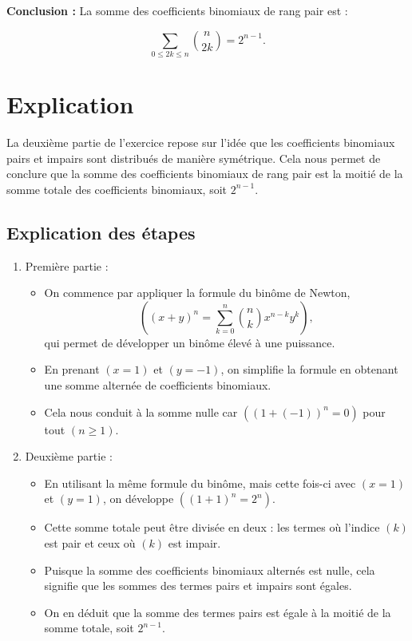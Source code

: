\documentclass[a4paper,oneside,12pt]{amsbook}
\theoremstyle{definition}
\theoremstyle{remark}
\begin{document}
\textbf{Conclusion :} La somme des coefficients binomiaux de rang pair est :

\[
\sum_{0 \leq 2k \leq n} \binom{n}{2k} = 2^{n-1}.
\]

\section*{Explication}

La deuxième partie de l'exercice repose sur l'idée que les coefficients binomiaux pairs et impairs sont distribués de manière symétrique. Cela nous permet de conclure que la somme des coefficients binomiaux de rang pair est la moitié de la somme totale des coefficients binomiaux, soit \(2^{n-1}\).

\subsection*{Explication des étapes }
    \begin{enumerate}
        \item Première partie :
	\begin{itemize}
	    \item On commence par appliquer la formule du binôme de Newton, $$((x + y)^n = \sum_{k=0}^n \binom{n}{k} x^{n-k} y^k),$$ qui permet de développer un binôme élevé à une puissance.
     \item En prenant $(x = 1)$ et $(y = -1)$, on simplifie la formule en obtenant une somme alternée de coefficients binomiaux.
     \item Cela nous conduit à la somme nulle car $((1 + (-1))^n = 0)$ pour tout $(n \geq 1).$
	\end{itemize}
     \item Deuxième partie :
     \begin{itemize}
		\item En utilisant la même formule du binôme, mais cette fois-ci avec $(x = 1)$ et $(y = 1)$, on développe $((1 + 1)^n = 2^n)$.
	      \item 	Cette somme totale peut être divisée en deux : les termes où l’indice $(k)$ est pair et ceux où $(k)$ est impair.
       \item Puisque la somme des coefficients binomiaux alternés est nulle, cela signifie que les sommes des termes pairs et impairs sont égales.
       \item On en déduit que la somme des termes pairs est égale à la moitié de la somme totale, soit $2^{n-1}$.
     \end{itemize}
     
    \end{enumerate}
\end{document}
